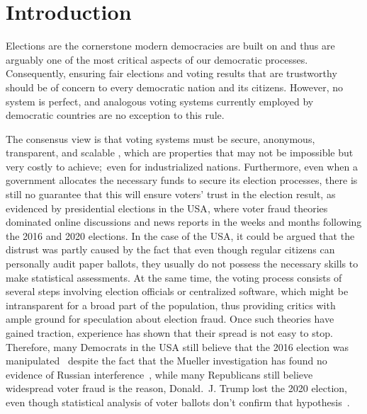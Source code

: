 \chapter{Introduction}\label{ch:intro}

Elections are the cornerstone modern democracies are built on and thus are arguably one of the most critical aspects of our democratic processes.
Consequently, ensuring fair elections and voting results that are trustworthy should be of concern to every democratic nation and its citizens.
However, no system is perfect, and analogous voting systems currently employed by democratic countries are no exception to this rule.

The consensus view is that voting systems must be secure, anonymous, transparent, and scalable
\autocites{lowry_desirable_2009}[5]{agora_agora_nodate}[9-11]{jafar_blockchain_2021},
which are properties that may not be impossible but very costly to achieve;\ even for industrialized nations.
Furthermore, even when a government allocates the necessary funds to secure its election processes, there is still no
guarantee that this will ensure voters' trust in the election result, as evidenced by presidential elections in the \Gls{USA}, where voter fraud theories dominated online discussions and news reports in the weeks and months following the 2016 and 2020 elections.
In the case of the \Gls{USA}, it could be argued that the distrust was partly caused by the fact that even though regular citizens can personally audit paper ballots, they usually do not possess the necessary skills to make statistical assessments.
At the same time, the voting process consists of several steps involving election officials or centralized software, which might be intransparent for a broad part of the population, thus providing critics with ample ground for speculation about election fraud.
Once such theories have gained traction, experience has shown that their spread is not easy to stop.
Therefore, many Democrats in the \Gls{USA} still believe that the 2016 election was manipulated~\autocite{sinclair_its_2018}
despite the fact that the Mueller investigation has found no evidence of Russian interference~\autocite{mueller_report_2019}, while many Republicans still believe widespread voter fraud is the reason,
Donald.\ J. Trump lost the 2020 election, even though statistical analysis of voter ballots don't confirm that hypothesis~\autocite{eggers_no_2021}.

